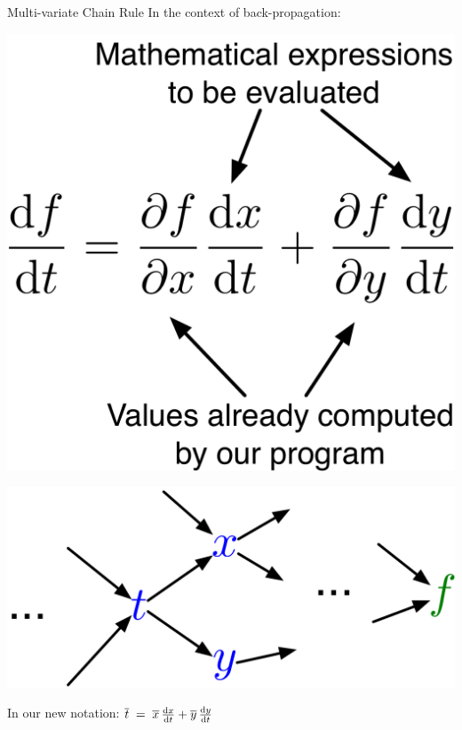 \documentclass[handout,aspectratio=169]{beamer}
\begin{document}
\begin{frame}{Multi-variate Chain Rule}
In the context of back-propagation:
\vspace{1em}

\begin{minipage}{0.5\textwidth}

\includegraphics[width=0.7\linewidth]{pics/label_equation.png}

\end{minipage}\begin{minipage}{0.5\textwidth}

\includegraphics[width=1\linewidth]{pics/multivariate_context.png}
\end{minipage}

\vspace{1em}

In our new notation:\qquad \quad
 {\Large   $ \overline{t} \;=\; \overline{x} \, \frac{\mathrm{d} x}{\mathrm{d} t} + \overline{y} \, \frac{\mathrm{d} y}{\mathrm{d} t} $}
\end{frame}
\end{document}
